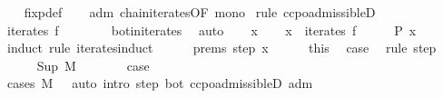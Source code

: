 \begin{isabellebody}
%
\isadelimproof
\ \ %
\endisadelimproof
%
\isatagproof
{}\isamarkupfalse%
\ fixp{\isacharunderscore}{\kern0pt}def\isanewline
\ \ \isamarkupfalse%
\ adm\ chain{\isacharunderscore}{\kern0pt}iterates{\isacharbrackleft}{\kern0pt}OF\ mono{\isacharbrackright}{\kern0pt}\isanewline
{}\isamarkupfalse%
\ {\isacharparenleft}{\kern0pt}rule\ ccpo{\isachardot}{\kern0pt}admissibleD{\isacharparenright}{\kern0pt}\isanewline
\ \ \isamarkupfalse%
\ {\isachardoublequoteopen}iterates\ f\ {\isasymnoteq}\ {\isacharbraceleft}{\kern0pt}{\isacharbraceright}{\kern0pt}{\isachardoublequoteclose}\isanewline
\ \ \ \ \isamarkupfalse%
\ bot{\isacharunderscore}{\kern0pt}in{\isacharunderscore}{\kern0pt}iterates\ \isamarkupfalse%
\ auto\isanewline
{}\isamarkupfalse%
\isanewline
\ \ \isamarkupfalse%
\ x\isanewline
\ \ \isamarkupfalse%
\ {\isachardoublequoteopen}x\ {\isasymin}\ iterates\ f{\isachardoublequoteclose}\isanewline
\ \ \isamarkupfalse%
\ \isamarkupfalse%
\ {\isachardoublequoteopen}P\ x{\isachardoublequoteclose}\isanewline
\ \ \isamarkupfalse%
\ {\isacharparenleft}{\kern0pt}induct\ rule{\isacharcolon}{\kern0pt}\ iterates{\isachardot}{\kern0pt}induct{\isacharparenright}{\kern0pt}\isanewline
\ \ \ \ \isamarkupfalse%
\ prems{\isacharcolon}{\kern0pt}\ {\isacharparenleft}{\kern0pt}step\ x{\isacharparenright}{\kern0pt}\isanewline
\ \ \ \ \isamarkupfalse%
\ this{\isacharparenleft}{\kern0pt}{}{\isacharparenright}{\kern0pt}\ \isamarkupfalse%
\ {\isacharquery}{\kern0pt}case\ \isamarkupfalse%
\ {\isacharparenleft}{\kern0pt}rule\ step{\isacharparenright}{\kern0pt}\isanewline
\ \ \isamarkupfalse%
\isanewline
\ \ \ \ \isamarkupfalse%
\ {\isacharparenleft}{\kern0pt}Sup\ M{\isacharparenright}{\kern0pt}\isanewline
\ \ \ \ \isamarkupfalse%
\ \isamarkupfalse%
\ {\isacharquery}{\kern0pt}case\ \isamarkupfalse%
\ {\isacharparenleft}{\kern0pt}cases\ {\isachardoublequoteopen}M\ {\isacharequal}{\kern0pt}\ {\isacharbraceleft}{\kern0pt}{\isacharbraceright}{\kern0pt}{\isachardoublequoteclose}{\isacharparenright}{\kern0pt}\ {\isacharparenleft}{\kern0pt}auto\ intro{\isacharcolon}{\kern0pt}\ step\ bot\ ccpo{\isachardot}{\kern0pt}admissibleD\ adm{\isacharparenright}{\kern0pt}\isanewline
\ \ \isamarkupfalse%
\isanewline
{}\isamarkupfalse%

\end{isabellebody}
